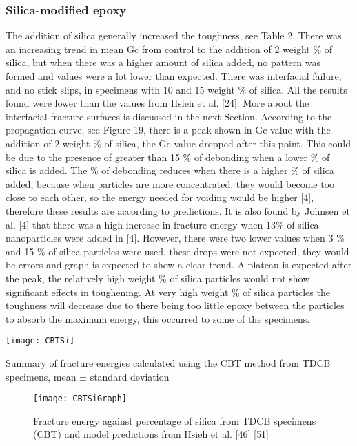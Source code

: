 \documentclass[numbers=noendperiod,chapterprefix=on]{icldt} %
\begin{document}
\subsubsection{Silica-modified epoxy}
The addition of silica generally increased the toughness, see Table 2. There was an increasing trend in mean Gc from control to the addition of 2 weight \% of silica, but when there was a higher amount of silica added, no pattern was formed and values were a lot lower than expected. There was interfacial failure, and no stick slips, in specimens with 10 and 15 weight \% of silica. All the results found were lower than the values from Hsieh et al. [24]. More about the interfacial fracture surfaces is discussed in the next Section. 
According to the propagation curve, see Figure 19, there is a peak shown in Gc value with the addition of 2 weight \% of silica, the Gc value dropped after this point. This could be due to the presence of greater than 15 \% of debonding when a lower \% of silica is added. The \% of debonding reduces when there is a higher \% of silica added, because when particles are more concentrated, they would become too close to each other, so the energy needed for voiding would be higher [4], therefore these results are according to predictions. It is also found by Johnsen et al. [4] that there was a high increase in fracture energy when 13\% of silica nanoparticles were added in [4]. However, there were two lower values when 3 \% and 15 \% of silica particles were used, these drops were not expected, they would be errors and graph is expected to show a clear trend. A plateau is expected after the peak, the relatively high weight \% of silica particles would not show significant effects in toughening. At very high weight \% of silica particles the toughness will decrease due to there being too little epoxy between the particles to absorb the maximum energy, this occurred to some of the specimens. 

\begin{table}[!htpb]
\centering
\texttt{[image: CBTSi]}
\caption{Summary of fracture energies calculated using the CBT method from TDCB specimens, mean ± standard deviation} %
\end{table}
\FloatBarrier
\begin{figure}[!htpb]
\centering
\texttt{[image: CBTSiGraph]}
\caption{Fracture energy against percentage of silica from TDCB specimens (CBT) and model predictions from Hsieh et al. [46] [51] } %
\end{figure}
\FloatBarrier
\end{document}
